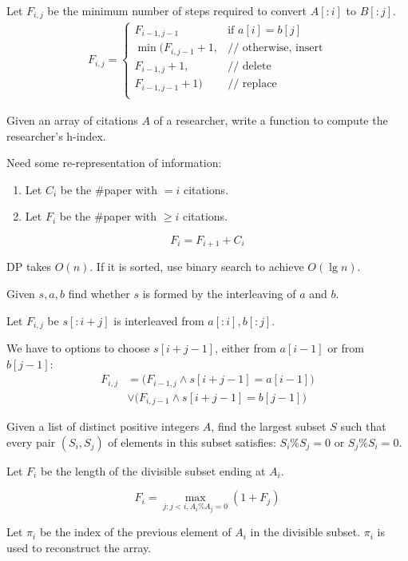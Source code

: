 Let $F_{i, j}$ be the minimum number
of steps required to convert $A[:i]$ to $B[:j]$.
\begin{eqnarray*}
F_{i, j} = 
\left\{ 
\begin{array}{rl}
  F_{i-1, j-1} &\mbox{if $a[i]=b[j]$} \\
  \min\Big(F_{i, j-1}+1, &\mbox{// otherwise, insert}\\
  F_{i-1, j}+1, &\mbox{// delete}\\
  F_{i-1, j-1}+1\Big) &\mbox{// replace}\\
\end{array} 
\right.
\end{eqnarray*}

 Given an array of citations $A$ of a researcher, write a function to compute the researcher's h-index.

Need some re-representation of information: 
\begin{enumerate}
\item Let $C_i$ be the \#paper with $=i$ citations.
\item Let $F_i$ be the \#paper with $\geq i$ citations.
\end{enumerate}
$$
F_i = F_{i+1} + C_i
$$

DP takes $O(n)$. If it is sorted, use binary search to achieve $O(\lg n)$.

 Given $s, a, b$ find whether $s$ is formed by the interleaving
of $a$ and $b$.

Let $F_{i,j}$ be $s[:i+j]$ is interleaved from $a[:i], b[:j]$.

We have to options to choose $s[i+j-1]$, either from $a[i-1]$ or from $b[j-1]$:
\begin{align*}
F_{i,j} &= \Big(F_{i-1, j} \wedge s[i+j-1] = a[i-1]\Big) \\
& \vee \Big(F_{i,j-1} \wedge s[i+j-1] = b[j-1]\Big)
\end{align*}

 Given a list of distinct positive integers $A$, find the largest subset $S$ such that every pair $(S_i, S_j)$ of elements in this
subset satisfies: $S_i \% S_j = 0 \text{ or } S_j \% S_i = 0$.

Let $F_i$ be the length of the divisible subset ending at $A_i$. 

$$
F_i = \max_{j: j< i, A_i\%A_j=0}(1+F_j)
$$

Let $\pi_i$ be the index of the previous element of $A_i$ in the divisible subset. $\pi_i$ is used to reconstruct the array.

